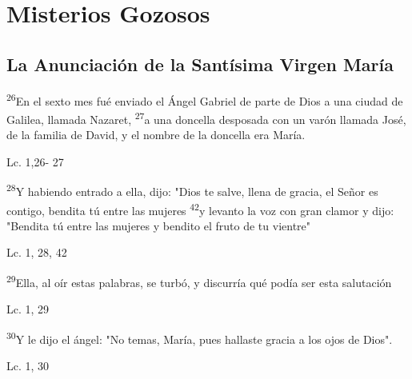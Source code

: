 \documentclass[a4paper,11pt,sans]{article}
\begin{document}
  \section*{\hfil Misterios Gozosos \hfil}
    \subsection*{\hfil La Anunciación de la Santísima Virgen María \hfil}
      
          

      \textsuperscript{26}En el sexto mes fué enviado el Ángel Gabriel de parte de Dios a una ciudad de Galilea, llamada Nazaret, \textsuperscript{27}a una 
      doncella desposada con un varón llamada José, de la familia de David, y el nombre de la doncella era María.
      
      \begin{center}
        Lc. 1,26- 27           
      \end{center}
      
      \textsuperscript{28}Y habiendo entrado a ella, dijo: "Dios te salve, llena de gracia, el Señor es contigo, bendita tú entre las mujeres 
      \textsuperscript{42}y levanto la voz con gran clamor y dijo: "Bendita tú entre las mujeres y bendito el fruto de tu vientre"
      
      \begin{center}
        Lc. 1, 28, 42      
      \end{center}
      
      \textsuperscript{29}Ella, al oír estas palabras, se turbó, y discurría qué podía ser esta salutación

      \begin{center}
        Lc. 1, 29         
      \end{center}
      
      \textsuperscript{30}Y le dijo el ángel: "No temas, María, pues hallaste gracia a los ojos de Dios".

      \begin{center}
        Lc. 1, 30         
      \end{center}
      
\end{document}
